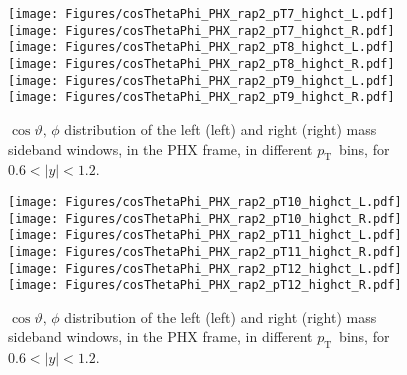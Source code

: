 \documentclass[12pt]{article}
\newcommand{\pt}{$p_{\mathrm{T}}$}
\begin{document}
\begin{figure}[htbp]
\centering
\texttt{[image: Figures/cosThetaPhi\_PHX\_rap2\_pT7\_highct\_L.pdf]}
\texttt{[image: Figures/cosThetaPhi\_PHX\_rap2\_pT7\_highct\_R.pdf]}
\texttt{[image: Figures/cosThetaPhi\_PHX\_rap2\_pT8\_highct\_L.pdf]}
\texttt{[image: Figures/cosThetaPhi\_PHX\_rap2\_pT8\_highct\_R.pdf]}
\texttt{[image: Figures/cosThetaPhi\_PHX\_rap2\_pT9\_highct\_L.pdf]}
\texttt{[image: Figures/cosThetaPhi\_PHX\_rap2\_pT9\_highct\_R.pdf]}
\caption{$\cos\vartheta,\,\phi$ distribution of the left (left) and
  right (right) mass sideband windows, in the PHX frame, in different
  \pt\ bins, for $0.6 < |y| < 1.2$.}
\end{figure}
\clearpage

\begin{figure}[htbp]
\centering
\texttt{[image: Figures/cosThetaPhi\_PHX\_rap2\_pT10\_highct\_L.pdf]}
\texttt{[image: Figures/cosThetaPhi\_PHX\_rap2\_pT10\_highct\_R.pdf]}
\texttt{[image: Figures/cosThetaPhi\_PHX\_rap2\_pT11\_highct\_L.pdf]}
\texttt{[image: Figures/cosThetaPhi\_PHX\_rap2\_pT11\_highct\_R.pdf]}
\texttt{[image: Figures/cosThetaPhi\_PHX\_rap2\_pT12\_highct\_L.pdf]}
\texttt{[image: Figures/cosThetaPhi\_PHX\_rap2\_pT12\_highct\_R.pdf]}
\caption{$\cos\vartheta,\,\phi$ distribution of the left (left) and
  right (right) mass sideband windows, in the PHX frame, in different
  \pt\ bins, for $0.6 < |y| < 1.2$.}
\end{figure}
\clearpage
\end{document}

